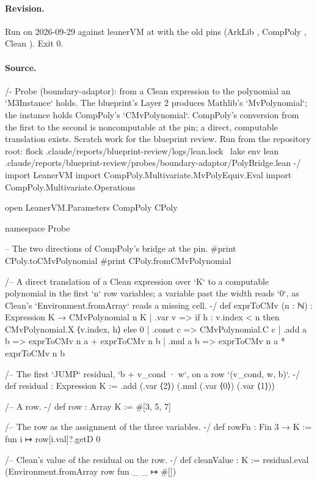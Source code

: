 \paragraph{Revision.} Run on 2026-09-29 against leanerVM  at  with the old pins (ArkLib , CompPoly , Clean ). Exit 0.

\paragraph{Source.}
\begin{leancode}[numbers=left,numbersep=3pt]
/-
  Probe (boundary-adaptor): from a Clean expression to the polynomial an `M3Instance` holds.
  The blueprint's Layer 2 produces Mathlib's `MvPolynomial`; the instance holds CompPoly's
  `CMvPolynomial`. CompPoly's conversion from the first to the second is noncomputable at the
  pin; a direct, computable translation exists. Scratch work for the blueprint review.
  Run from the repository root:
    flock .claude/reports/blueprint-review/logs/lean.lock \
      lake env lean .claude/reports/blueprint-review/probes/boundary-adaptor/PolyBridge.lean
-/
import LeanerVM
import CompPoly.Multivariate.MvPolyEquiv.Eval
import CompPoly.Multivariate.Operations

open LeanerVM.Parameters CompPoly CPoly

namespace Probe

-- The two directions of CompPoly's bridge at the pin.
#print CPoly.toCMvPolynomial
#print CPoly.fromCMvPolynomial

/-- A direct translation of a Clean expression over `K` to a computable polynomial in the first
`n` row variables; a variable past the width reads `0`, as Clean's `Environment.fromArray`
reads a missing cell. -/
def exprToCMv (n : ℕ) : Expression K → CMvPolynomial n K
  | .var v => if h : v.index < n then CMvPolynomial.X ⟨v.index, h⟩ else 0
  | .const c => CMvPolynomial.C c
  | .add a b => exprToCMv n a + exprToCMv n b
  | .mul a b => exprToCMv n a * exprToCMv n b

/-- The first `JUMP` residual, `b + v_cond · w`, on a row `(v_cond, w, b)`. -/
def residual : Expression K := .add (.var ⟨2⟩) (.mul (.var ⟨0⟩) (.var ⟨1⟩))

/-- A row. -/
def row : Array K := #[3, 5, 7]

/-- The row as the assignment of the three variables. -/
def rowFn : Fin 3 → K := fun i ↦ row[i.val]?.getD 0

/-- Clean's value of the residual on the row. -/
def cleanValue : K := residual.eval (Environment.fromArray row fun _ _ ↦ #[])


\end{leancode}
